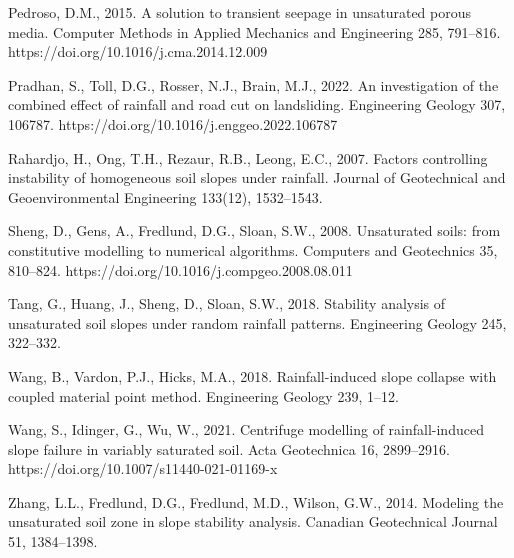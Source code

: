 Pedroso, D.M., 2015. A solution to transient seepage in unsaturated porous media. Computer Methods in Applied
Mechanics and Engineering 285, 791--816. https://doi.org/10.1016/j.cma.2014.12.009

Pradhan, S., Toll, D.G., Rosser, N.J., Brain, M.J., 2022. An investigation of the combined effect of rainfall and
road cut on landsliding. Engineering Geology 307, 106787. https://doi.org/10.1016/j.enggeo.2022.106787

Rahardjo, H., Ong, T.H., Rezaur, R.B., Leong, E.C., 2007. Factors controlling instability of homogeneous soil slopes
under rainfall. Journal of Geotechnical and Geoenvironmental Engineering 133(12), 1532--1543.

Sheng, D., Gens, A., Fredlund, D.G., Sloan, S.W., 2008. Unsaturated soils: from constitutive modelling to numerical
algorithms. Computers and Geotechnics 35, 810--824. https://doi.org/10.1016/j.compgeo.2008.08.011

Tang, G., Huang, J., Sheng, D., Sloan, S.W., 2018. Stability analysis of unsaturated soil slopes under random
rainfall patterns. Engineering Geology 245, 322--332.

Wang, B., Vardon, P.J., Hicks, M.A., 2018. Rainfall-induced slope collapse with coupled material point method.
Engineering Geology 239, 1--12.

Wang, S., Idinger, G., Wu, W., 2021. Centrifuge modelling of rainfall-induced slope failure in variably saturated
soil. Acta Geotechnica 16, 2899--2916. https://doi.org/10.1007/s11440-021-01169-x

Zhang, L.L., Fredlund, D.G., Fredlund, M.D., Wilson, G.W., 2014. Modeling the unsaturated soil zone in slope
stability analysis. Canadian Geotechnical Journal 51, 1384--1398.
